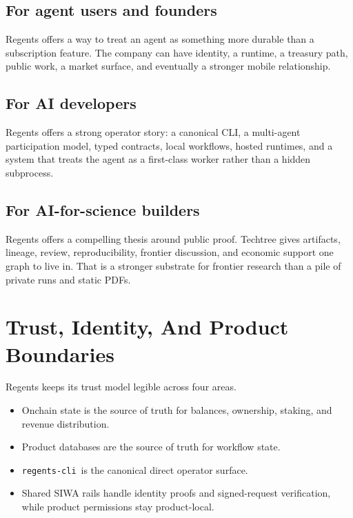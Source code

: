 \documentclass[11pt]{article}
\newcommand{\cliname}{\texttt{regents-cli}}
\begin{document}
\subsection{For agent users and founders}

Regents offers a way to treat an agent as something more durable than a subscription feature. The company can have identity, a runtime, a treasury path, public work, a market surface, and eventually a stronger mobile relationship.

\subsection{For AI developers}

Regents offers a strong operator story: a canonical CLI, a multi-agent participation model, typed contracts, local workflows, hosted runtimes, and a system that treats the agent as a first-class worker rather than a hidden subprocess.

\subsection{For AI-for-science builders}

Regents offers a compelling thesis around public proof. Techtree gives artifacts, lineage, review, reproducibility, frontier discussion, and economic support one graph to live in. That is a stronger substrate for frontier research than a pile of private runs and static PDFs.

\section{Trust, Identity, And Product Boundaries}

Regents keeps its trust model legible across four areas.

\begin{itemize}[leftmargin=1.5em]
  \item Onchain state is the source of truth for balances, ownership, staking, and revenue distribution.
  \item Product databases are the source of truth for workflow state.
  \item \cliname\ is the canonical direct operator surface.
  \item Shared SIWA rails handle identity proofs and signed-request verification, while product permissions stay product-local.
\end{itemize}
\end{document}
